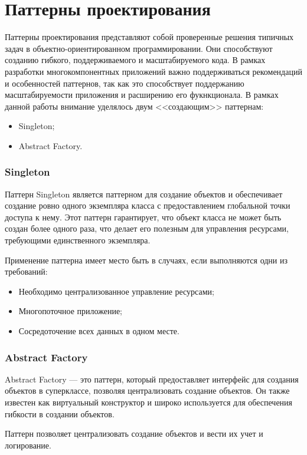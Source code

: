 \section{Паттерны проектирования}

Паттерны проектирования представляют собой проверенные решения типичных задач в объектно-ориентированном программировании. Они способствуют созданию гибкого, поддерживаемого и масштабируемого кода. В рамках разработки многокомпонентных приложений важно поддерживаться рекомендаций и особенностей паттернов, так как это способствует поддержанию масштабируемости приложения и расширению его фукнкционала. 
В рамках данной работы внимание уделялось двум <<создающим>> паттернам: 
\begin{itemize}
  \item Singleton;
  \item Abstract Factory.
\end{itemize}

\subsubsection{Singleton}

Паттерн Singleton является паттерном для создание объектов и обеспечивает
создание ровно одного экземпляра класса с предоставлением глобальной точки
доступа к нему. Этот паттерн гарантирует, что объект класса не может быть
создан более одного раза, что делает его полезным для управления ресурсами,
требующими единственного экземпляра.

Применение паттерна имеет место быть в случаях, если выполняются одни из
требований:

\begin{itemize}
  \item Необходимо централизованное управление ресурсами;
  \item Многопоточное приложение;
  \item Сосредоточение всех данных в одном месте. 
\end{itemize}

\subsubsection{Abstract Factory}

Abstract Factory — это паттерн, который предоставляет интерфейс для создания
объектов в суперклассе, позволяя централизовать создание объектов. Он также
известен как виртуальный конструктор и широко используется для обеспечения
гибкости в создании объектов. 

Паттерн позволяет централизовать создание объектов и вести их учет и
логирование. 
